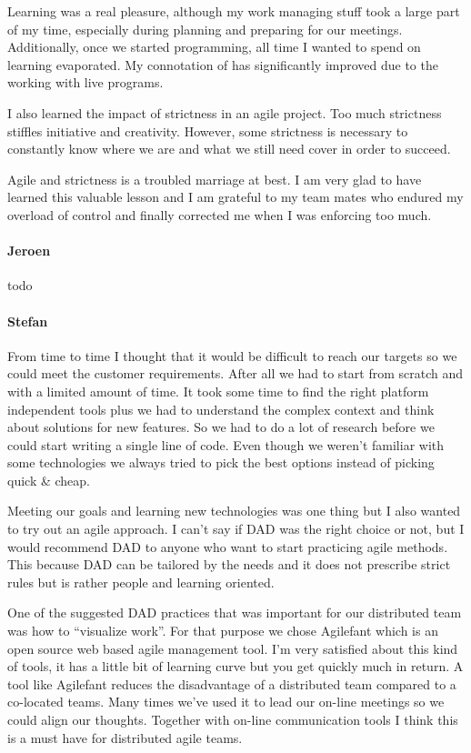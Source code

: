 Learning \cpp was a real pleasure, although my work managing stuff took a large part of my time,
especially during planning and preparing for our meetings. Additionally, once we started programming,
all time I wanted to spend on learning \cpp evaporated. My connotation of \cpp has significantly improved
due to the working with live \cpp programs.

I also learned the impact of strictness in an agile project. Too much strictness stiffles initiative 
and creativity. However, some strictness is necessary to constantly know where we are and what we 
still need cover in order to succeed.

Agile and strictness is a troubled marriage at best. I am very glad to have learned this valuable lesson and
I am grateful to my team mates who endured my overload of control and finally corrected me when I was 
enforcing too much.

\paragraph{Jeroen}
todo \\ 

\paragraph{Stefan}
From time to time I thought that it would be difficult to reach our targets so
we could meet the customer requirements. After all we had to start from scratch
and with a limited amount of time. It took some time to find the right platform
independent tools plus we had to understand the complex context and think about
solutions for new features. So we had to do a lot of research before we could
start writing a single line of code. Even though we weren't familiar with some
technologies we always tried to pick the best options instead of picking quick
\& cheap.

Meeting our goals and learning new technologies was one thing but I also wanted
to try out an agile approach. I can't say if DAD was the right choice or not,
but I would recommend DAD to anyone who want to start practicing agile methods.
This because DAD can be tailored by the needs and it does not prescribe strict
rules but is rather people and learning oriented.

One of the suggested DAD practices that was important for our distributed team
was how to ``visualize work''. For that purpose we chose Agilefant which is an
open source web based agile management tool. I'm very satisfied about this kind
of tools, it has a little bit of learning curve but you get quickly much in
return. A tool like Agilefant reduces the disadvantage of a distributed team
compared to a co-located teams. Many times we've used it to lead our on-line
meetings so we could align our thoughts. Together with on-line communication
tools I think this is a must have for distributed agile teams.


